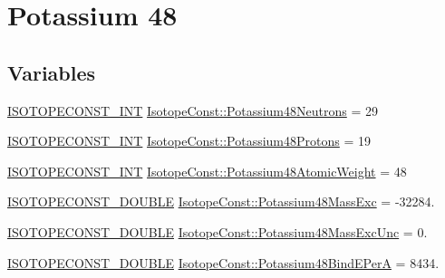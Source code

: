 \hypertarget{group___isotope_const-_potassium-_k48}{}\section{Potassium 48}
\label{group___isotope_const-_potassium-_k48}
\subsection*{Variables}
\begin{DoxyCompactItemize}
\item 
\mbox{\hyperlink{group___isotope_const-_macros_ga5f18360b3e99483a35c32d789e62621c}{I\+S\+O\+T\+O\+P\+E\+C\+O\+N\+S\+T\+\_\+\+I\+NT}} \mbox{\hyperlink{group___isotope_const-_potassium-_k48_gaa73e0d4055a4562202efaa11f4b89c4d}{Isotope\+Const\+::\+Potassium48\+Neutrons}} = 29
\item 
\mbox{\hyperlink{group___isotope_const-_macros_ga5f18360b3e99483a35c32d789e62621c}{I\+S\+O\+T\+O\+P\+E\+C\+O\+N\+S\+T\+\_\+\+I\+NT}} \mbox{\hyperlink{group___isotope_const-_potassium-_k48_ga8dc005cc8a265d833ec2068e723ffda8}{Isotope\+Const\+::\+Potassium48\+Protons}} = 19
\item 
\mbox{\hyperlink{group___isotope_const-_macros_ga5f18360b3e99483a35c32d789e62621c}{I\+S\+O\+T\+O\+P\+E\+C\+O\+N\+S\+T\+\_\+\+I\+NT}} \mbox{\hyperlink{group___isotope_const-_potassium-_k48_ga00cb3aba2396e803dde90a89314e14eb}{Isotope\+Const\+::\+Potassium48\+Atomic\+Weight}} = 48
\item 
\mbox{\hyperlink{group___isotope_const-_macros_ga8f45a7272ce02c0b4c65c44636ed719a}{I\+S\+O\+T\+O\+P\+E\+C\+O\+N\+S\+T\+\_\+\+D\+O\+U\+B\+LE}} \mbox{\hyperlink{group___isotope_const-_potassium-_k48_ga8471cd37f40cf3398f479ae77cc5aa6c}{Isotope\+Const\+::\+Potassium48\+Mass\+Exc}} = -\/32284.
\item 
\mbox{\hyperlink{group___isotope_const-_macros_ga8f45a7272ce02c0b4c65c44636ed719a}{I\+S\+O\+T\+O\+P\+E\+C\+O\+N\+S\+T\+\_\+\+D\+O\+U\+B\+LE}} \mbox{\hyperlink{group___isotope_const-_potassium-_k48_ga9723a2e17e8de263d039ae26576257d1}{Isotope\+Const\+::\+Potassium48\+Mass\+Exc\+Unc}} = 0.
\item 
\mbox{\hyperlink{group___isotope_const-_macros_ga8f45a7272ce02c0b4c65c44636ed719a}{I\+S\+O\+T\+O\+P\+E\+C\+O\+N\+S\+T\+\_\+\+D\+O\+U\+B\+LE}} \mbox{\hyperlink{group___isotope_const-_potassium-_k48_ga3692c1d52eefc4a8e6ea2d795556eca9}{Isotope\+Const\+::\+Potassium48\+Bind\+E\+PerA}} = 8434.
\item 

\end{DoxyCompactItemize}
